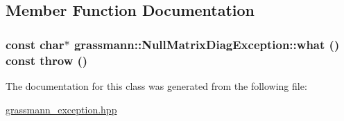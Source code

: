 \subsection{Member Function Documentation}
\hypertarget{classgrassmann_1_1NullMatrixDiagException_77aa3ba59a7e6e78204e5216f459b167}{
\subsubsection[what]{\setlength{\rightskip}{0pt plus 5cm}const char$\ast$ grassmann::NullMatrixDiagException::what () const  throw ()}}
\label{classgrassmann_1_1NullMatrixDiagException_77aa3ba59a7e6e78204e5216f459b167}




The documentation for this class was generated from the following file:\begin{CompactItemize}
\item 
\hyperlink{grassmann__exception_8hpp}{grassmann\_\-exception.hpp}\end{CompactItemize}
